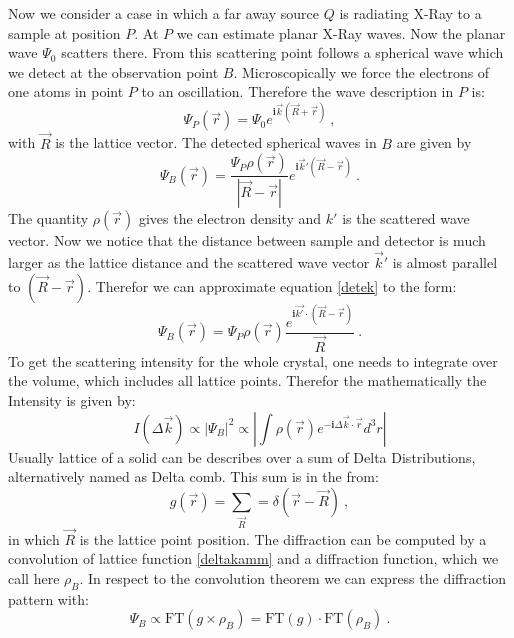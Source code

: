 	Now we consider a case in which a far away source $Q$ is radiating X-Ray to a sample at position $P$. At $P$ we can estimate planar X-Ray waves. Now the planar wave $\Psi_0$ scatters there. From this scattering point follows a spherical wave which we detect at the observation point $B$. Microscopically we force the electrons of one atoms in point $P$ to an oscillation. Therefore the wave description in $P$ is:
	\begin{equation}
		\Psi_P(\vec r)= \Psi_0 e^{\boldsymbol{i}\vec k (\vec R+\vec r)}~\mathrm{,}
	\end{equation}
	with $\vec R$ is the lattice vector. The detected spherical waves in $B$ are given by
	\begin{equation}
		\Psi_B(\vec r)= \frac{\Psi_P \rho(\vec r)}{|\vec R- \vec r|}e^{\boldsymbol{i}\vec k' (\vec R - \vec r)}~\mathrm{.}
		\label{detek}
	\end{equation}
	The quantity $\rho(\vec r)$ gives the electron density and $k'$ is the scattered wave vector. Now we notice that the distance between sample and detector is much larger as the lattice distance and the scattered wave vector $\vec k'$ is almost parallel to $(\vec R-\vec r)$. Therefor we can approximate equation \ref{detek} to the form:
	\begin{equation}
		\Psi_B(\vec{r})=\Psi_P \rho(\vec r) \frac{e^{\boldsymbol{i}\vec {k'} \cdot (\vec R-\vec r)}}{\vec R}~\mathrm{.}
	\end{equation}
	To get the scattering intensity for the whole crystal, one needs to integrate over the volume, which includes all lattice points. Therefor the mathematically the Intensity is given by:
	\begin{equation}
		I(\Delta \vec k)\propto |\Psi_B|^2\propto|\int \rho(\vec r) e^{-\boldsymbol{i}\Delta \vec k \cdot \vec r}d^3r|
	\end{equation}
	Usually lattice of a solid can be describes over a sum of Delta Distributions, alternatively named as Delta comb. This sum is in the from:
	\begin{equation}
		g(\vec r)=\sum_{\vec R}=\delta(\vec r -\vec R)~\mathrm{,}
		\label{deltakamm}
	\end{equation}
	in which $\vec R$ is the lattice point position. The diffraction can be computed by a convolution of lattice function \ref{deltakamm} and a diffraction function, which we call here $\rho_B$. In respect to the convolution theorem we can express the diffraction pattern with:
	\begin{equation}
		\Psi_B \propto \mathrm{FT}(g \times \rho_B)=\mathrm{FT}(g) \cdot \mathrm{FT}(\rho_B)~\mathrm{.}
	\end{equation}
